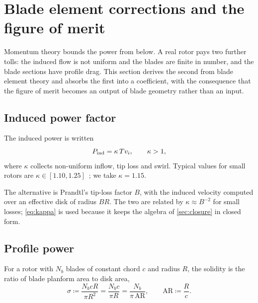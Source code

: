﻿\section{Blade element corrections and the figure of merit}
\label{sec:blade}

Momentum theory bounds the power from below. A real rotor pays two further
tolls: the induced flow is not uniform and the blades are finite in number, and
the blade sections have profile drag. This section derives the second from
blade element theory and absorbs the first into a coefficient, with the
consequence that the figure of merit becomes an output of blade geometry rather
than an input.

\subsection{Induced power factor}

\begin{model}
\label{mod:kappa}
The induced power is written
\begin{equation}
  P_{\mathrm{ind}} = \kappa\,Tv_i, \qquad \kappa > 1 ,
  \label{eq:kappa}
\end{equation}
where $\kappa$ collects non-uniform inflow, tip loss and swirl. Typical values
for small rotors are $\kappa \in [1.10,1.25]$~\cite[\S2.4]{leishman2006}; we
take $\kappa = 1.15$.
\end{model}

The alternative is Prandtl's tip-loss factor $B$, with the induced velocity
computed over an effective disk of radius $BR$. The two are related by
$\kappa \approx B^{-2}$ for small losses; \cref{eq:kappa} is used because it
keeps the algebra of \cref{sec:closure} in closed form.

\subsection{Profile power}

\begin{definition}[Solidity]
For a rotor with $N_b$ blades of constant chord $c$ and radius $R$, the
solidity is the ratio of blade planform area to disk area,
\begin{equation}
  \sigma \coloneqq \frac{N_b c R}{\pi R^2} = \frac{N_b c}{\pi R}
        = \frac{N_b}{\pi\,\mathrm{AR}},
  \qquad \mathrm{AR} \coloneqq \frac{R}{c} .
  \label{eq:solidity}
\end{equation}
\end{definition}

